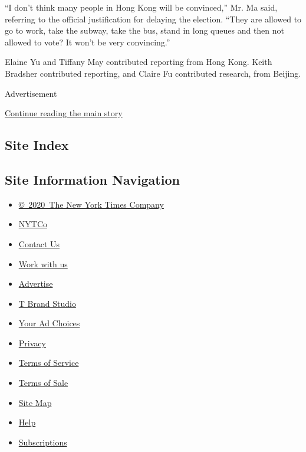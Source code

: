 ``I don't think many people in Hong Kong will be convinced,'' Mr. Ma
said, referring to the official justification for delaying the election.
``They are allowed to go to work, take the subway, take the bus, stand
in long queues and then not allowed to vote? It won't be very
convincing.''

Elaine Yu and Tiffany May contributed reporting from Hong Kong. Keith
Bradsher contributed reporting, and Claire Fu contributed research, from
Beijing.

Advertisement

\protect\hyperlink{after-bottom}{Continue reading the main story}

\hypertarget{site-index}{%
\subsection{Site Index}\label{site-index}}

\hypertarget{site-information-navigation}{%
\subsection{Site Information
Navigation}\label{site-information-navigation}}

\begin{itemize}
\tightlist
\item
  \href{https://help.nytimes3xbfgragh.onion/hc/en-us/articles/115014792127-Copyright-notice}{©~2020~The
  New York Times Company}
\end{itemize}

\begin{itemize}
\tightlist
\item
  \href{https://www.nytco.com/}{NYTCo}
\item
  \href{https://help.nytimes3xbfgragh.onion/hc/en-us/articles/115015385887-Contact-Us}{Contact
  Us}
\item
  \href{https://www.nytco.com/careers/}{Work with us}
\item
  \href{https://nytmediakit.com/}{Advertise}
\item
  \href{http://www.tbrandstudio.com/}{T Brand Studio}
\item
  \href{https://www.nytimes3xbfgragh.onion/privacy/cookie-policy\#how-do-i-manage-trackers}{Your
  Ad Choices}
\item
  \href{https://www.nytimes3xbfgragh.onion/privacy}{Privacy}
\item
  \href{https://help.nytimes3xbfgragh.onion/hc/en-us/articles/115014893428-Terms-of-service}{Terms
  of Service}
\item
  \href{https://help.nytimes3xbfgragh.onion/hc/en-us/articles/115014893968-Terms-of-sale}{Terms
  of Sale}
\item
  \href{https://spiderbites.nytimes3xbfgragh.onion}{Site Map}
\item
  \href{https://help.nytimes3xbfgragh.onion/hc/en-us}{Help}
\item
  \href{https://www.nytimes3xbfgragh.onion/subscription?campaignId=37WXW}{Subscriptions}
\end{itemize}
